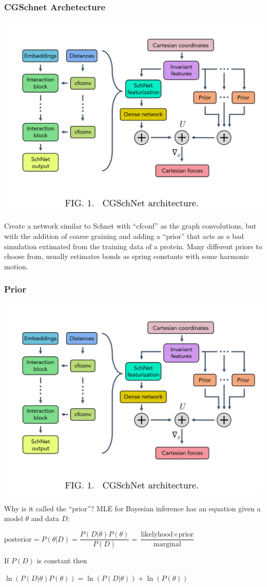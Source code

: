 \documentclass{beamer}
\begin{document}
\begin{frame}
  \frametitle{CGSchnet Archetecture}
  \begin{center}
    \includegraphics[width=0.5\linewidth]{./cgschnet_arch.png}
  \end{center}
  Create a network similar to Schnet with ``cfconf'' as the graph convolutions, but with the addition of coarse graining and adding a ``prior'' that acts as a bad simulation extimated from the training data of a protein. Many different priors to choose from, usually estimates bonds as spring constants with some harmonic motion.
\end{frame}
\begin{frame}
  \frametitle{Prior}
  \begin{center}
    \includegraphics[width=0.3\linewidth]{./cgschnet_arch.png}
  \end{center}
  \small\begin{block}{Why is it called the ``prior''?}
  MLE for Bayesian inference has an equation given a model $\theta$ and data $D$:\\
  \begin{center}
    $\text{posterior} = P(\theta | D) = \dfrac{P(D | \theta) P(\theta)}{P(D)} = \dfrac{\text{likelyhood} \times \text{prior}}{\text{marginal}}$
  \end{center}
  If $P(D)$ is constant then
  \begin{center}
    $\ln(P(D | \theta) P(\theta)) = \ln(P(D | \theta)) + \ln(P(\theta))$
  \end{center}
  \end{block}
\end{frame}
\end{document}

